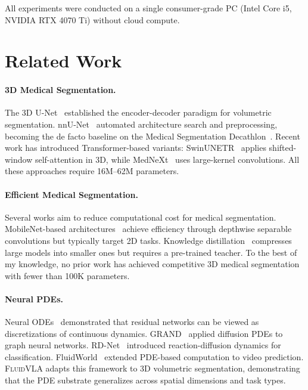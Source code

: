 \documentclass{article}
\newcommand{\fluidvla}{\textsc{FluidVLA}}
\begin{document}
All experiments were conducted on a single consumer-grade PC (Intel Core i5, NVIDIA RTX 4070 Ti) without cloud compute.

\section{Related Work}
\label{sec:related}

\paragraph{3D Medical Segmentation.}
The 3D U-Net~\cite{cciccek20163dunet} established the encoder-decoder paradigm for volumetric segmentation. nnU-Net~\cite{isensee2021nnunet} automated architecture search and preprocessing, becoming the de facto baseline on the Medical Segmentation Decathlon~\cite{antonelli2022msd}. Recent work has introduced Transformer-based variants: SwinUNETR~\cite{hatamizadeh2022swinunetr} applies shifted-window self-attention in 3D, while MedNeXt~\cite{roy2023mednext} uses large-kernel convolutions. All these approaches require 16M--62M parameters.

\paragraph{Efficient Medical Segmentation.}
Several works aim to reduce computational cost for medical segmentation. MobileNet-based architectures~\cite{howard2017mobilenets} achieve efficiency through depthwise separable convolutions but typically target 2D tasks. Knowledge distillation~\cite{hinton2015distilling} compresses large models into smaller ones but requires a pre-trained teacher. To the best of my knowledge, no prior work has achieved competitive 3D medical segmentation with fewer than 100K parameters.

\paragraph{Neural PDEs.}
Neural ODEs~\cite{chen2018neural} demonstrated that residual networks can be viewed as discretizations of continuous dynamics. GRAND~\cite{chamberlain2021grand} applied diffusion PDEs to graph neural networks. RD-Net~\cite{zhang2023rdnet} introduced reaction-diffusion dynamics for classification. FluidWorld~\cite{polly2026fluidworld} extended PDE-based computation to video prediction. \fluidvla{} adapts this framework to 3D volumetric segmentation, demonstrating that the PDE substrate generalizes across spatial dimensions and task types.
\end{document}
